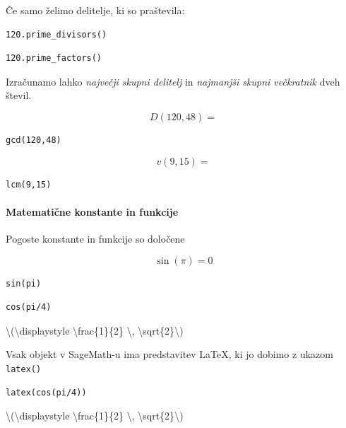 Če samo želimo delitelje, ki so praštevila:

\begin{verbatim}
120.prime_divisors()
\end{verbatim}

\begin{verbatim}
120.prime_factors()
\end{verbatim}

Izračunamo lahko \textit{največji skupni delitelj} in \textit{najmanjši skupni večkratnik} dveh števil.

\begin{equation}
D(120,48) =
\end{equation}

\begin{verbatim}
gcd(120,48)
\end{verbatim}

\begin{equation}
v(9,15) =
\end{equation}

\begin{verbatim}
lcm(9,15)
\end{verbatim}

\paragraph{Matematične konstante in funkcije}

Pogoste konstante in funkcije so določene

\begin{equation}
\sin(\pi) = 0
\end{equation}

\begin{verbatim}
sin(pi)
\end{verbatim}

\begin{verbatim}
cos(pi/4)
\end{verbatim}

{\textbackslash}({\textbackslash}displaystyle {\textbackslash}frac\{1\}\{2\} {\textbackslash}, {\textbackslash}sqrt\{2\}{\textbackslash})

Vsak objekt v SageMath-u ima predstavitev LaTeX, ki jo dobimo z ukazom \texttt{latex()}

\begin{verbatim}
latex(cos(pi/4))
\end{verbatim}

{\textbackslash}({\textbackslash}displaystyle {\textbackslash}frac\{1\}\{2\} {\textbackslash}, {\textbackslash}sqrt\{2\}{\textbackslash})

